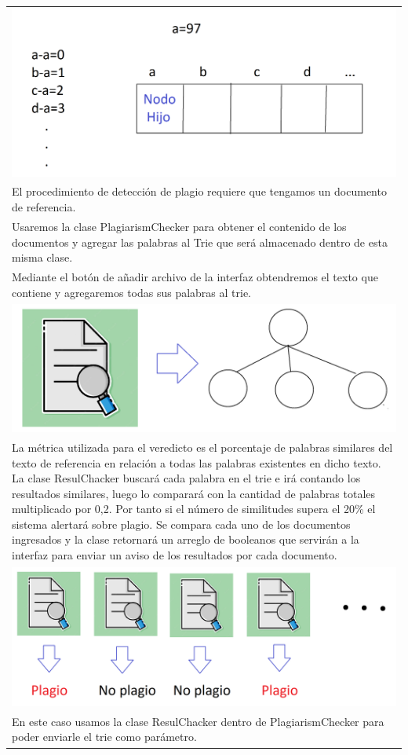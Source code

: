 \documentclass[9pt]{article}
\begin{document}
\begin{longtable}{|p{15cm}|}
		\includegraphics[width=14cm]{img/asignacionLetras.png}\\
		El procedimiento de detección de plagio requiere que tengamos un documento de referencia.\\
		Usaremos la clase PlagiarismChecker para obtener el contenido de los documentos y agregar las palabras al Trie que será almacenado dentro de esta misma clase.\\
		Mediante el botón de añadir archivo de la interfaz obtendremos el texto que contiene y agregaremos todas sus palabras al trie.\\
		\includegraphics[width=14cm]{img/importarTexto.png}\\
		La métrica utilizada para el veredicto es el porcentaje de palabras similares del texto de referencia en relación a todas las palabras existentes en dicho texto.
		La clase ResulChacker buscará cada palabra en el trie e irá contando los resultados similares, luego lo comparará con la cantidad de palabras totales multiplicado por 0,2.
		Por tanto si el número de similitudes supera el 20\% el sistema alertará sobre plagio.
		Se compara cada uno de los documentos ingresados y la clase retornará un arreglo de booleanos que servirán a la interfaz para enviar un aviso de los resultados por cada documento.\\
		\includegraphics[width=14cm]{img/resultadosMultiples.png}\\
		
		En este caso usamos la clase ResulChacker dentro de PlagiarismChecker para poder enviarle el trie como parámetro.\\
	
		\hline
	\end{longtable}
\end{document}
